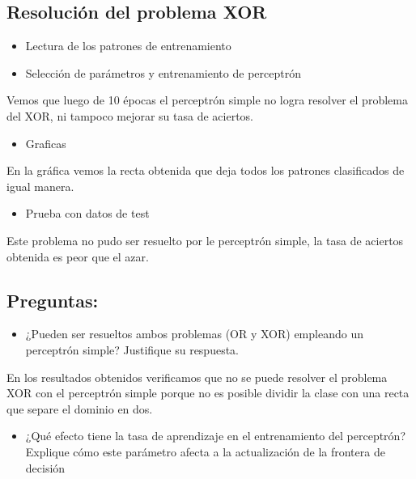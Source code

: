 \documentclass[]{book}
\providecommand{\tightlist}{%
  \setlength{\itemsep}{0pt}\setlength{\parskip}{0pt}}
\begin{document}
\hypertarget{resolucion-del-problema-xor}{%
\subsection{Resolución del problema XOR}\label{resolucion-del-problema-xor}}

\begin{itemize}
\item
  Lectura de los patrones de entrenamiento
\item
  Selección de parámetros y entrenamiento de perceptrón
\end{itemize}

Vemos que luego de 10 épocas el perceptrón simple no logra resolver el problema del XOR, ni tampoco mejorar su tasa de aciertos.

\begin{itemize}
\tightlist
\item
  Graficas
\end{itemize}

En la gráfica vemos la recta obtenida que deja todos los patrones clasificados de igual manera.

\begin{itemize}
\tightlist
\item
  Prueba con datos de test
\end{itemize}

Este problema no pudo ser resuelto por le perceptrón simple, la tasa de aciertos obtenida es peor que el azar.

\hypertarget{preguntas}{%
\subsection{Preguntas:}\label{preguntas}}

\begin{itemize}
\tightlist
\item
  ¿Pueden ser resueltos ambos problemas (OR y XOR) empleando un perceptrón simple? Justifique su respuesta.
\end{itemize}

En los resultados obtenidos verificamos que no se puede resolver el problema XOR con el perceptrón simple porque no es posible dividir la clase con una recta que separe el dominio en dos.

\begin{itemize}
\tightlist
\item
  ¿Qué efecto tiene la tasa de aprendizaje en el entrenamiento del perceptrón? Explique cómo este parámetro afecta a la actualización de la frontera de decisión
\end{itemize}
\end{document}
